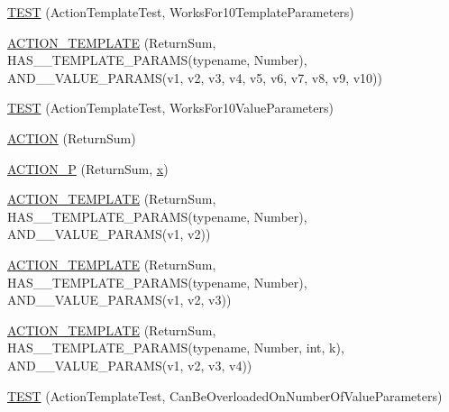 \begin{DoxyCompactItemize}
\item 
\mbox{\hyperlink{namespacetesting_1_1gmock__generated__actions__test_a39707e50b998b0866ea7dec54099f38f}{T\+E\+ST}} (Action\+Template\+Test, Works\+For10\+Template\+Parameters)
\item 
\mbox{\hyperlink{namespacetesting_1_1gmock__generated__actions__test_a0e21a6c1f43a7125a29e6e1edcd7006c}{A\+C\+T\+I\+O\+N\+\_\+\+T\+E\+M\+P\+L\+A\+TE}} (Return\+Sum, H\+A\+S\+\_\+\_\+\+T\+E\+M\+P\+L\+A\+T\+E\+\_\+\+P\+A\+R\+A\+MS(typename, Number), A\+N\+D\+\_\+\_\+\+V\+A\+L\+U\+E\+\_\+\+P\+A\+R\+A\+MS(v1, v2, v3, v4, v5, v6, v7, v8, v9, v10))
\item 
\mbox{\hyperlink{namespacetesting_1_1gmock__generated__actions__test_aa8dd9ea1777fe67626bab2815b7261f4}{T\+E\+ST}} (Action\+Template\+Test, Works\+For10\+Value\+Parameters)
\item 
\mbox{\hyperlink{namespacetesting_1_1gmock__generated__actions__test_a49c180470c75de1ab88cd2928e738d33}{A\+C\+T\+I\+ON}} (Return\+Sum)
\item 
\mbox{\hyperlink{namespacetesting_1_1gmock__generated__actions__test_acae7628c76df0e3b54ea80459fe3cf60}{A\+C\+T\+I\+O\+N\+\_\+P}} (Return\+Sum, \mbox{\hyperlink{_obj__test_2lib_2googletest-master_2googlemock_2test_2gmock-matchers__test_8cc_a6150e0515f7202e2fb518f7206ed97dc}{x}})
\item 
\mbox{\hyperlink{namespacetesting_1_1gmock__generated__actions__test_a0d95dcce021580cf2a2af2a91348a01b}{A\+C\+T\+I\+O\+N\+\_\+\+T\+E\+M\+P\+L\+A\+TE}} (Return\+Sum, H\+A\+S\+\_\+\_\+\+T\+E\+M\+P\+L\+A\+T\+E\+\_\+\+P\+A\+R\+A\+MS(typename, Number), A\+N\+D\+\_\+\_\+\+V\+A\+L\+U\+E\+\_\+\+P\+A\+R\+A\+MS(v1, v2))
\item 
\mbox{\hyperlink{namespacetesting_1_1gmock__generated__actions__test_a5241672e22af49093d3601ac42c9a5ca}{A\+C\+T\+I\+O\+N\+\_\+\+T\+E\+M\+P\+L\+A\+TE}} (Return\+Sum, H\+A\+S\+\_\+\_\+\+T\+E\+M\+P\+L\+A\+T\+E\+\_\+\+P\+A\+R\+A\+MS(typename, Number), A\+N\+D\+\_\+\_\+\+V\+A\+L\+U\+E\+\_\+\+P\+A\+R\+A\+MS(v1, v2, v3))
\item 
\mbox{\hyperlink{namespacetesting_1_1gmock__generated__actions__test_a03e55dabaa60ff2cda602c702ef3ff76}{A\+C\+T\+I\+O\+N\+\_\+\+T\+E\+M\+P\+L\+A\+TE}} (Return\+Sum, H\+A\+S\+\_\+\_\+\+T\+E\+M\+P\+L\+A\+T\+E\+\_\+\+P\+A\+R\+A\+MS(typename, Number, int, k), A\+N\+D\+\_\+\_\+\+V\+A\+L\+U\+E\+\_\+\+P\+A\+R\+A\+MS(v1, v2, v3, v4))
\item 
\mbox{\hyperlink{namespacetesting_1_1gmock__generated__actions__test_aa84c5b4f29e052340459e12649ce7209}{T\+E\+ST}} (Action\+Template\+Test, Can\+Be\+Overloaded\+On\+Number\+Of\+Value\+Parameters)

\end{DoxyCompactItemize}
